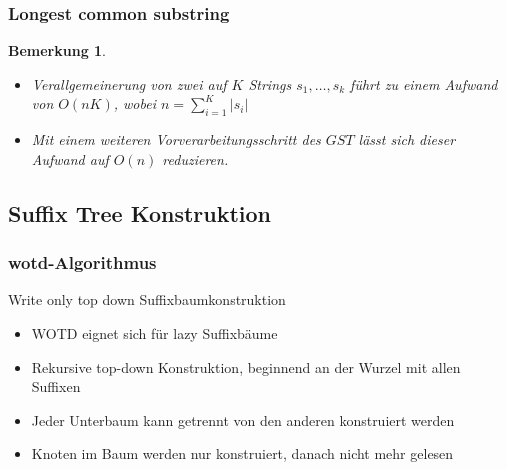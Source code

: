 \documentclass{beamer}
\newtheorem{remark}{Bemerkung}
\newcommand{\abs}[1]{\left|#1\right|}
\begin{document}
\begin{frame}
\frametitle{Longest common substring}
\begin{remark}
    \begin{itemize}
        \item Verallgemeinerung von zwei auf $K$ Strings $s_1, \dots, s_k$ führt zu einem Aufwand von $O(nK)$, wobei $n = \sum_{i = 1}^K \abs{s_i}$
        \item Mit einem weiteren Vorverarbeitungsschritt des $GST$ lässt sich dieser Aufwand auf $O(n)$ reduzieren.
    \end{itemize}
\end{remark}
\end{frame}

\subsection{Suffix Tree Konstruktion}

\frame{\subsectionpage}

\begin{frame}
\frametitle{wotd-Algorithmus}
Write only top down Suffixbaumkonstruktion
\begin{itemize}
    \item WOTD eignet sich für lazy Suffixbäume
    \item Rekursive top-down Konstruktion, beginnend an der Wurzel mit allen Suffixen
    \item Jeder Unterbaum kann getrennt von den anderen konstruiert werden
    \item Knoten im Baum werden nur konstruiert, danach nicht mehr gelesen
\end{itemize}
\end{frame}
\end{document}
